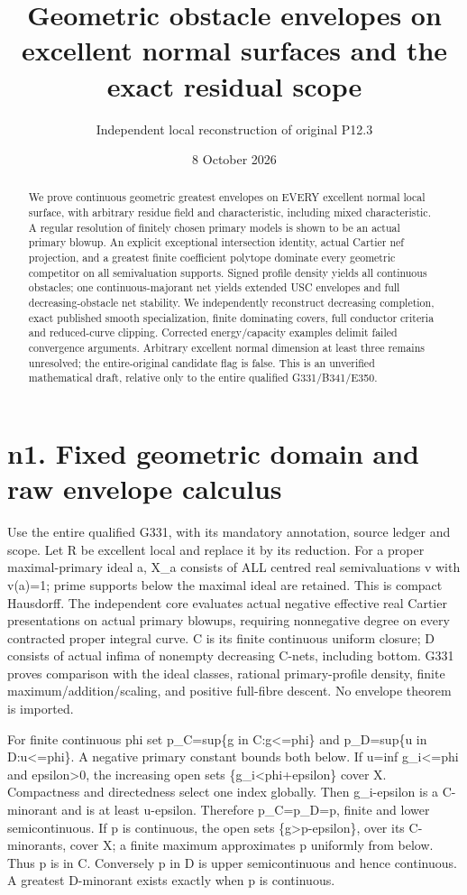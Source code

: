\documentclass[11pt]{article}
\title{Geometric obstacle envelopes on excellent normal surfaces and the exact residual scope}
\author{Independent local reconstruction of original P12.3}
\date{8 October 2026}
\begin{document}
\maketitle
\begin{abstract}We prove continuous geometric greatest envelopes on EVERY excellent normal local surface, with arbitrary residue field and characteristic, including mixed characteristic. A regular resolution of finitely chosen primary models is shown to be an actual primary blowup. An explicit exceptional intersection identity, actual Cartier nef projection, and a greatest finite coefficient polytope dominate every geometric competitor on all semivaluation supports. Signed profile density yields all continuous obstacles; one continuous-majorant net yields extended USC envelopes and full decreasing-obstacle net stability. We independently reconstruct decreasing completion, exact published smooth specialization, finite dominating covers, full conductor criteria and reduced-curve clipping. Corrected energy/capacity examples delimit failed convergence arguments. Arbitrary excellent normal dimension at least three remains unresolved; the entire-original candidate flag is false. This is an unverified mathematical draft, relative only to the entire qualified G331/B341/E350.\end{abstract}\tableofcontents
\section{n1. Fixed geometric domain and raw envelope calculus}

Use the entire qualified G331, with its mandatory annotation, source ledger and scope. Let R be excellent local and replace it by its reduction. For a proper maximal-primary ideal a, X\_a consists of ALL centred real semivaluations v with v(a)=1; prime supports below the maximal ideal are retained. This is compact Hausdorff. The independent core evaluates actual negative effective real Cartier presentations on actual primary blowups, requiring nonnegative degree on every contracted proper integral curve. C is its finite continuous uniform closure; D consists of actual infima of nonempty decreasing C-nets, including bottom. G331 proves comparison with the ideal classes, rational primary-profile density, finite maximum/addition/scaling, and positive full-fibre descent. No envelope theorem is imported.

For finite continuous phi set p\_C=sup\{g in C:g<=phi\} and p\_D=sup\{u in D:u<=phi\}. A negative primary constant bounds both below. If u=inf g\_i<=phi and epsilon>0, the increasing open sets \{g\_i<phi+epsilon\} cover X. Compactness and directedness select one index globally. Then g\_i-epsilon is a C-minorant and is at least u-epsilon. Therefore p\_C=p\_D=p, finite and lower semicontinuous. If p is continuous, the open sets \{g>p-epsilon\}, over its C-minorants, cover X; a finite maximum approximates p uniformly from below. Thus p is in C. Conversely p in D is upper semicontinuous and hence continuous. A greatest D-minorant exists exactly when p is continuous.
\end{document}
